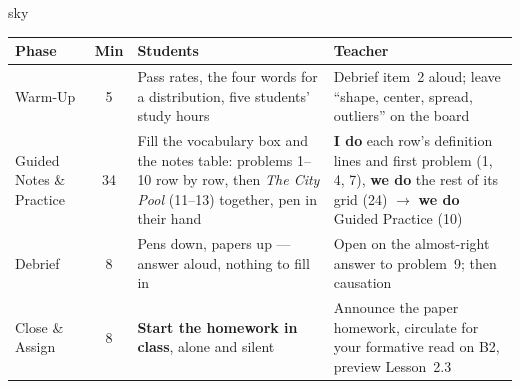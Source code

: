 \documentclass[10pt]{article}
\begin{document}
\boxguard[30]
\begin{skillbox}{sky}
\renewcommand{\arraystretch}{1.25}
\begin{tabularx}{\linewidth}{@{}l c X X@{}}
\textbf{Phase} & \textbf{Min} & \textbf{Students} & \textbf{Teacher} \\
\hline
Warm-Up & 5 & Pass rates, the four words for a distribution, five students' study hours & Debrief item~2 aloud; leave ``shape, center, spread, outliers'' on the board \\
Guided Notes \& Practice & 34 & Fill the vocabulary box and the notes table: problems 1--10 row by row, then \emph{The City Pool} (11--13) together, pen in their hand & \textbf{I do} each row's definition lines and first problem (1, 4, 7), \textbf{we do} the rest of its grid (24) $\to$ \textbf{we do} Guided Practice (10) \\
Debrief & 8 & Pens down, papers up --- answer aloud, nothing to fill in & Open on the almost-right answer to problem~9; then causation \\
Close \& Assign & 8 & \textbf{Start the homework in class}, alone and silent & Announce the paper homework, circulate for your formative read on B2, preview Lesson~2.3 \\
\end{tabularx}
\end{skillbox}
\end{document}
